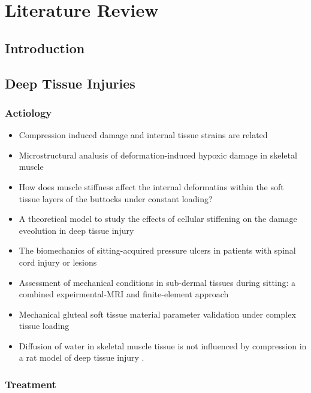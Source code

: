 \chapter{Literature Review}
	\section{Introduction}
		\lipsum[1]
	\section{Deep Tissue Injuries}
		\lipsum[1]
		\subsection{Aetiology}
			\begin{itemize}
				\item Compression induced damage and internal tissue strains are related \cite{ceelen08}
				\item Microstructural analusis of deformation-induced hypoxic damage in skeletal muscle \cite{ceelen08-8}
				\item How does muscle stiffness affect the internal deformatins within the soft tissue layers of the buttocks under constant loading? \cite{loerakker13}
				\item A theoretical model to study the effects of cellular stiffening on the damage eveolution in deep tissue injury \cite{nagel09}
				\item The biomechanics of sitting-acquired pressure ulcers in patients with spinal cord injury or lesions \cite{gefen07-9}
				\item Assessment of mechanical conditions in sub-dermal tissues during sitting: a combined expeirmental-MRI and finite-element approach \cite{linderganz06}
				\item Mechanical gluteal soft tissue material parameter validation under complex tissue loading \cite{then09}
				\item Diffusion of water in skeletal muscle tissue is not influenced by compression in a rat model of deep tissue injury \cite{vanNierop10}.
			\end{itemize}
		\subsection{Treatment}
			\lipsum[1]
